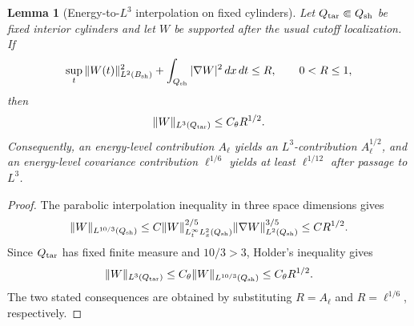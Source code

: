\documentclass[11pt]{article}
\numberwithin{equation}{section}
\theoremstyle{plain}
\newtheorem{lemma}{Lemma}[section]
\theoremstyle{definition}
\theoremstyle{remark}
\begin{document}
\begin{lemma}[Energy-to-\(L^3\) interpolation on fixed cylinders]\label{pI:lem:energy-to-L3}
Let \(Q_{\rm tar}\Subset Q_{\rm sh}\) be fixed interior cylinders and let \(W\) be supported after the usual cutoff localization.  If
\[
        \sup_{t}\|W(t)\|_{L^2(B_{\rm sh})}^2
        +\int_{Q_{\rm sh}}|\nabla W|^2\,dx\,dt
        \le R,
        \qquad 0<R\le1,
\]
then
\[
        \|W\|_{L^3(Q_{\rm tar})}
        \le C_{\theta} R^{1/2}.
\]
Consequently, an energy-level contribution \(A_\ell\) yields an \(L^3\)-contribution \(A_\ell^{1/2}\), and an energy-level covariance contribution \(\ell^{1/6}\) yields at least \(\ell^{1/12}\) after passage to \(L^3\).
\end{lemma}

\begin{proof}
The parabolic interpolation inequality in three space dimensions gives
\[
        \|W\|_{L^{10/3}(Q_{\rm sh})}
        \le C
        \|W\|_{L^\infty_tL^2_x(Q_{\rm sh})}^{2/5}
        \|\nabla W\|_{L^2(Q_{\rm sh})}^{3/5}
        \le C R^{1/2}.
\]
Since \(Q_{\rm tar}\) has fixed finite measure and \(10/3>3\), Holder's inequality gives
\[
        \|W\|_{L^3(Q_{\rm tar})}
        \le C_\theta\|W\|_{L^{10/3}(Q_{\rm sh})}
        \le C_\theta R^{1/2}.
\]
The two stated consequences are obtained by substituting \(R=A_\ell\) and \(R=\ell^{1/6}\), respectively.
\end{proof}
\end{document}
